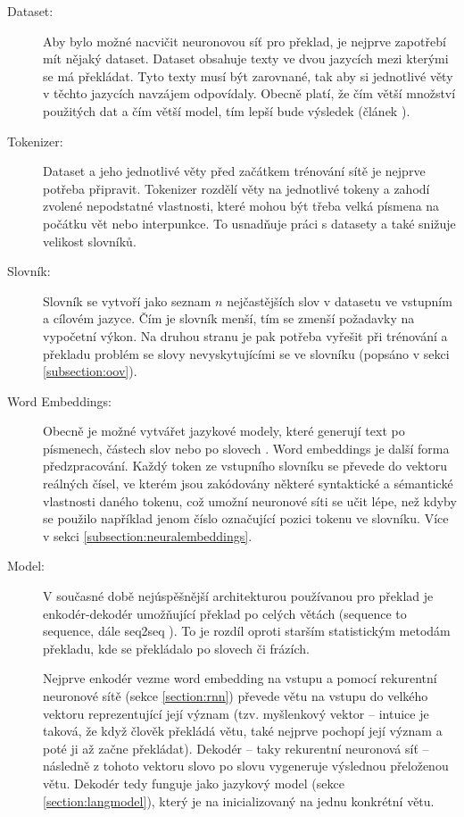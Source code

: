 \begin{description}
  \item[Dataset:] Aby bylo možné nacvičit neuronovou síť pro překlad, je nejprve zapotřebí mít nějaký dataset. Dataset obsahuje texty ve dvou jazycích mezi kterými se má překládat. Tyto texty musí být zarovnané, tak aby si jednotlivé věty v těchto jazycích navzájem odpovídaly. Obecně platí, že čím větší množství použitých dat a čím větší model, tím lepší bude výsledek (článek \cite{googleLimits}).

  \item[Tokenizer:] Dataset a jeho jednotlivé věty před začátkem trénování sítě je nejprve potřeba připravit. Tokenizer rozdělí věty na jednotlivé tokeny a zahodí zvolené nepodstatné vlastnosti, které mohou být třeba velká písmena na počátku vět nebo interpunkce. To usnadňuje práci s datasety a také snižuje velikost slovníků.

  \item[Slovník:] Slovník se vytvoří jako seznam $n$ nejčastějších slov v datasetu ve vstupním a cílovém jazyce. Čím je slovník menší, tím se zmenší požadavky na vypočetní výkon. Na druhou stranu je pak potřeba vyřešit při trénování a překladu problém se slovy nevyskytujícími se ve slovníku (popsáno v sekci \ref{subsection:oov}).

  \item[Word Embeddings:] Obecně je možné vytvářet jazykové modely, které generují text po písmenech, částech slov nebo po slovech \cite{mikolovSubwords}. Word embeddings je další forma předzpracování. Každý token ze vstupního slovníku se převede do vektoru reálných čísel, ve kterém jsou zakódovány některé syntaktické a sémantické vlastnosti daného tokenu, což umožní neuronové síti se učit lépe, než kdyby se použilo například jenom číslo označující pozici tokenu ve slovníku. Více v sekci \ref{subsection:neuralembeddings}.

  \item[Model:] V současné době nejúspěšnější architekturou používanou pro překlad je enkodér-dekodér umožňující překlad po celých větách (sequence to sequence, dále seq2seq \cite{seq2seq}). To je rozdíl oproti starším statistickým metodám překladu, kde se překládalo po slovech či frázích. 
      
      Nejprve enkodér vezme word embedding na vstupu a pomocí rekurentní neuronové sítě (sekce \ref{section:rnn}) převede větu na vstupu do velkého vektoru reprezentující její význam (tzv. myšlenkový vektor -- intuice je taková, že když člověk překládá větu, také nejprve pochopí její význam a poté ji až začne překládat). Dekodér -- taky rekurentní neuronová síť -- následně z tohoto vektoru slovo po slovu vygeneruje výslednou přeloženou větu. Dekodér tedy funguje jako jazykový model (sekce \ref{section:langmodel}), který je na inicializovaný na jednu konkrétní větu.
\end{description}


